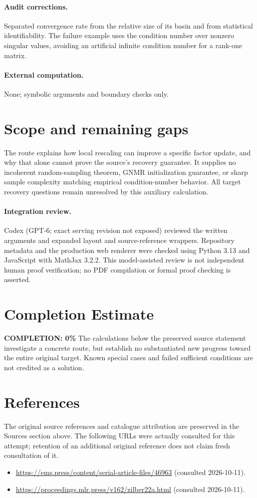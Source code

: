 \documentclass[11pt]{article}
\begin{document}
\paragraph{Audit corrections.} Separated convergence rate from the relative size of its basin and from
statistical identifiability. The failure example uses the condition number over
nonzero singular values, avoiding an artificial infinite condition number for a
rank-one matrix.
\paragraph{External computation.} None; symbolic arguments and boundary checks only.
\section{Scope and remaining gaps}

The route explains how local rescaling can improve a specific factor update,
and why that alone cannot prove the source's recovery guarantee. It supplies
no incoherent random-sampling theorem, GNMR initialization guarantee, or sharp
sample complexity matching empirical condition-number behavior. All target
recovery questions remain unresolved by this auxiliary calculation.

\paragraph{Integration review.} Codex (GPT-6; exact serving revision not exposed) reviewed the written arguments and expanded layout and source-reference wrappers. Repository metadata and the production web renderer were checked using Python 3.13 and JavaScript with MathJax 3.2.2. This model-assisted review is not independent human proof verification; no PDF compilation or formal proof checking is asserted.

\section{Completion Estimate}
\noindent\textbf{COMPLETION: 0\%}
The calculations below the preserved source statement investigate a concrete route,
but establish no substantiated new progress toward the entire original target.
Known special cases and failed sufficient conditions are not credited as a solution.
\section{References}
The original source references and catalogue attribution are preserved in the
Sources section above. The following URLs were actually consulted for this attempt;
retention of an additional original reference does not claim fresh consultation of it.
\begin{itemize}
\item \url{https://ems.press/content/serial-article-files/46963} (consulted 2026-10-11). 
\item \url{https://proceedings.mlr.press/v162/zilber22a.html} (consulted 2026-10-11). 
\end{itemize}
\end{document}
